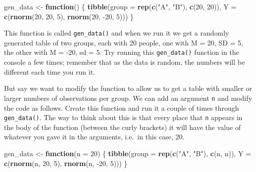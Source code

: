 \documentclass[]{book}
\newenvironment{Shaded}{\begin{snugshade}}{\end{snugshade}}
\newcommand{\ControlFlowTok}[1]{\textcolor[rgb]{0.13,0.29,0.53}{\textbf{#1}}}
\newcommand{\DataTypeTok}[1]{\textcolor[rgb]{0.13,0.29,0.53}{#1}}
\newcommand{\DecValTok}[1]{\textcolor[rgb]{0.00,0.00,0.81}{#1}}
\newcommand{\KeywordTok}[1]{\textcolor[rgb]{0.13,0.29,0.53}{\textbf{#1}}}
\newcommand{\NormalTok}[1]{#1}
\newcommand{\StringTok}[1]{\textcolor[rgb]{0.31,0.60,0.02}{#1}}
\begin{document}
\begin{Shaded}
\begin{Highlighting}[]
\NormalTok{gen_data <-}\StringTok{ }\ControlFlowTok{function}\NormalTok{() \{}
  \KeywordTok{tibble}\NormalTok{(}\DataTypeTok{group =} \KeywordTok{rep}\NormalTok{(}\KeywordTok{c}\NormalTok{(}\StringTok{"A"}\NormalTok{, }\StringTok{"B"}\NormalTok{), }\KeywordTok{c}\NormalTok{(}\DecValTok{20}\NormalTok{, }\DecValTok{20}\NormalTok{)),}
                  \DataTypeTok{Y =} \KeywordTok{c}\NormalTok{(}\KeywordTok{rnorm}\NormalTok{(}\DecValTok{20}\NormalTok{,  }\DecValTok{20}\NormalTok{, }\DecValTok{5}\NormalTok{), }\KeywordTok{rnorm}\NormalTok{(}\DecValTok{20}\NormalTok{, }\DecValTok{-20}\NormalTok{, }\DecValTok{5}\NormalTok{)))}
\NormalTok{\}}
\end{Highlighting}
\end{Shaded}

This function is called \texttt{gen\_data()} and when we run it we get a randomly generated table of two groups, each with 20 people, one with M = 20, SD = 5, the other with M = -20, sd = 5. Try running this \texttt{gen\_data()} function in the console a few times; remember that as the data is random, the numbers will be different each time you run it.

But say we want to modify the function to allow us to get a table with smaller or larger numbers of observations per group. We can add an argument \texttt{n} and modify the code as follows. Create this function and run it a couple of times through \texttt{gen\_data()}. The way to think about this is that every place that \texttt{n} appears in the body of the function (between the curly brackets) it will have the value of whatever you gave it in the arguments, i.e.~in this case, 20.

\begin{Shaded}
\begin{Highlighting}[]
\NormalTok{gen_data <-}\StringTok{ }\ControlFlowTok{function}\NormalTok{(}\DataTypeTok{n =} \DecValTok{20}\NormalTok{) \{}
  \KeywordTok{tibble}\NormalTok{(}\DataTypeTok{group =} \KeywordTok{rep}\NormalTok{(}\KeywordTok{c}\NormalTok{(}\StringTok{"A"}\NormalTok{, }\StringTok{"B"}\NormalTok{), }\KeywordTok{c}\NormalTok{(n, n)),}
                  \DataTypeTok{Y =} \KeywordTok{c}\NormalTok{(}\KeywordTok{rnorm}\NormalTok{(n,  }\DecValTok{20}\NormalTok{, }\DecValTok{5}\NormalTok{), }\KeywordTok{rnorm}\NormalTok{(n, }\DecValTok{-20}\NormalTok{, }\DecValTok{5}\NormalTok{)))}
\NormalTok{\}}
\end{Highlighting}
\end{Shaded}
\end{document}
